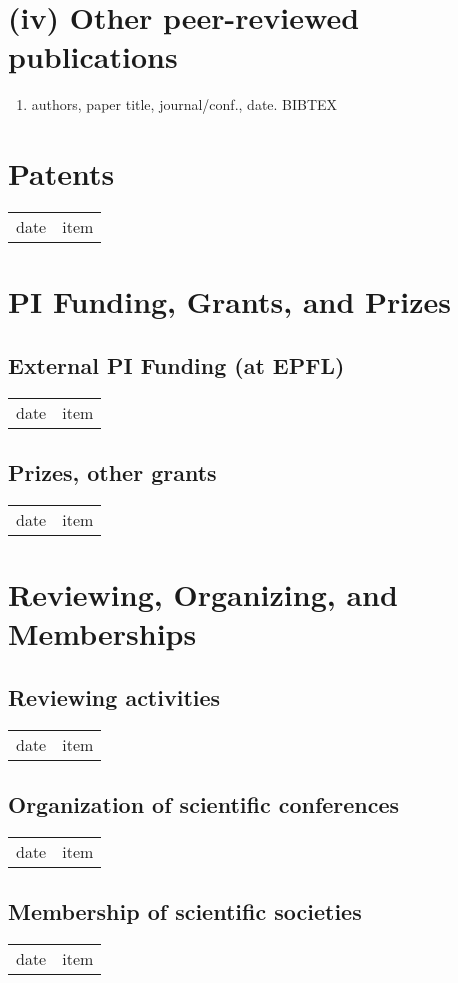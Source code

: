 \section{(iv) Other peer-reviewed publications}

\begin{enumerate}
\item authors, paper title, journal/conf., date. BIBTEX
\end{enumerate}

\section{Patents}
\begin{tabular}[l]{ p{} p{} }
date & item\\
\end{tabular} 

\section{PI Funding, Grants, and Prizes}

\subsection{External PI Funding (at EPFL)}
\begin{tabular}[l]{ p{} p{} }
date & item\\
\end{tabular} 

\subsection{Prizes, other grants}
\begin{tabular}[l]{ p{} p{} }
date & item\\
\end{tabular} 
\section{Reviewing, Organizing, and Memberships
}	
\subsection{Reviewing activities}
\begin{tabular}[l]{ p{} p{} }
date & item\\
\end{tabular} 

\subsection{Organization of scientific conferences}
\begin{tabular}[l]{ p{} p{} }
date & item\\
\end{tabular} 

\subsection{Membership of scientific societies}
\begin{tabular}[l]{ p{} p{} }
date & item\\
\end{tabular} 
